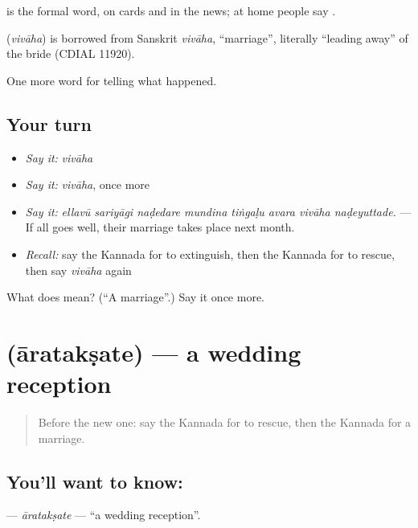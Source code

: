  is the formal word, on cards and in the news; at home people say .

\begin{cousinweb}
\textbf{} (\emph{vivāha}) is borrowed from Sanskrit \emph{vivāha}, \textquotedblleft{}marriage\textquotedblright{}, literally \textquotedblleft{}leading away\textquotedblright{} of the bride (CDIAL 11920).
\end{cousinweb}

\begin{grammarlens}[title={What you've built}]
One more word for telling what happened.
\end{grammarlens}

\subsection*{Your turn}
\begin{itemize}
\raggedright
  \item \emph{Say it:} \emph{vivāha}
  \item \emph{Say it:} \emph{vivāha}, once more
  \item \emph{Say it:} \emph{ellavū sariyāgi naḍedare mundina tiṅgaḷu avara vivāha naḍeyuttade.} — If all goes well, their marriage takes place next month.
  \item \emph{Recall:} say the Kannada for to extinguish, then the Kannada for to rescue, then say \emph{vivāha} again
\end{itemize}

\begin{tcolorbox}[breakable,colback=teal!4,colframe=teal!35!black,title={Before you move on}]
What does  mean? (\textquotedblleft{}A marriage\textquotedblright{}.) Say it once more.
\end{tcolorbox}
\section[\texorpdfstring{\kn{ಆರತಕ್ಷತೆ} (āratakṣate)}{ಆರತಕ್ಷತೆ (āratakṣate)}]{ (āratakṣate) — a wedding reception}

\label{lesson:KA-C325-arataksate}



\begin{quote}
Before the new one: say the Kannada for to rescue, then the Kannada for a marriage.
\end{quote}

\subsection*{You'll want to know: }
\textbf{} — \emph{āratakṣate} — \textquotedblleft{}a wedding reception\textquotedblright{}.

